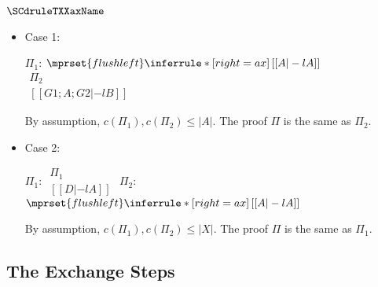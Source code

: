 \subsubsection{$\SCdruleTXXaxName$}
\begin{itemize}
\item Case 1:
      \begin{center}
        \scriptsize
        $\Pi_1$:
        \begin{math}
          $$\mprset{flushleft}
          \inferrule* [right={\tiny ax}] {
            \,
          }{[[A |-l A]]}
        \end{math}
        \qquad\qquad
        \begin{math}
          \begin{array}{c}
            \Pi_2 \\
            {[[G1; A; G2 |-l B]]}
          \end{array}
        \end{math}
      \end{center}
      By assumption, $c(\Pi_1),c(\Pi_2)\leq |A|$. The proof $\Pi$ is the
      same as $\Pi_2$.

\item Case 2:
      \begin{center}
        \scriptsize
        $\Pi_1$:
        \begin{math}
          \begin{array}{c}
            \Pi_1 \\
            {[[D |-l A]]}
          \end{array}
        \end{math}
        \qquad\qquad
        $\Pi_2$:
        \begin{math}
          $$\mprset{flushleft}
          \inferrule* [right={\tiny ax}] {
            \,
          }{[[A |-l A]]}
        \end{math}
      \end{center}
      By assumption, $c(\Pi_1),c(\Pi_2)\leq |X|$. The proof $\Pi$ is the
      same as $\Pi_1$.
\end{itemize}



\subsection{The Exchange Steps}

\subsubsection{\SCdruleTXXexName}

